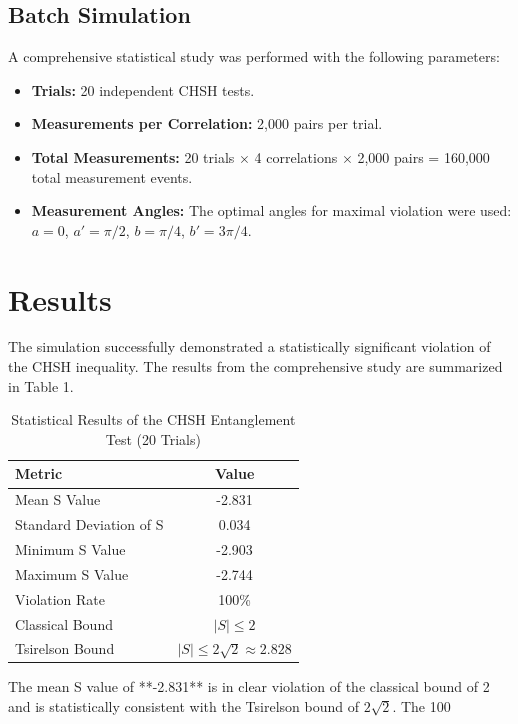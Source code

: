 \documentclass{article}
\begin{document}
\subsection{Batch Simulation}

A comprehensive statistical study was performed with the following parameters:
\begin{itemize}
    \item \textbf{Trials:} 20 independent CHSH tests.
    \item \textbf{Measurements per Correlation:} 2,000 pairs per trial.
    \item \textbf{Total Measurements:} 20 trials $\times$ 4 correlations $\times$ 2,000 pairs = 160,000 total measurement events.
    \item \textbf{Measurement Angles:} The optimal angles for maximal violation were used: $a=0$, $a'=\pi/2$, $b=\pi/4$, $b'=3\pi/4$.
\end{itemize}

\section{Results}

The simulation successfully demonstrated a statistically significant violation of the CHSH inequality. The results from the comprehensive study are summarized in Table 1.

\begin{table}[h!]
\centering
\caption{Statistical Results of the CHSH Entanglement Test (20 Trials)}
\begin{tabular}{|l|c|}
\hline
\textbf{Metric} & \textbf{Value} \\
\hline
Mean S Value & -2.831 \\
Standard Deviation of S & 0.034 \\
Minimum S Value & -2.903 \\
Maximum S Value & -2.744 \\
Violation Rate & 100\% \\
\hline
Classical Bound & $|S| \le 2$ \\
Tsirelson Bound & $|S| \le 2\sqrt{2} \approx 2.828$ \\
\hline
\end{tabular}
\end{table}


The mean S value of **-2.831** is in clear violation of the classical bound of 2 and is statistically consistent with the Tsirelson bound of $2\sqrt{2}$. The 100%
\end{document}
